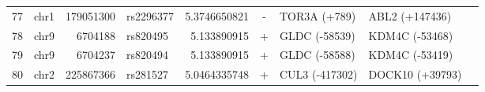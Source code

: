\begin{table}[h!]
\begin{tabular}{rlrlrcllc}
77 & chr1 & 179051300 & rs2296377 & 5.3746650821 & - & TOR3A (+789) & ABL2 (+147436)       & \\
78 & chr9 & 6704188 & rs820495 & 5.133890915 & + & GLDC (-58539) & KDM4C (-53468)       & \\
79 & chr9 & 6704237 & rs820494 & 5.133890915 & + & GLDC (-58588) & KDM4C (-53419)       & \\
80 & chr2 & 225867366 & rs281527 & 5.0464335748 & + & CUL3 (-417302) & DOCK10 (+39793)       & \\

\end{tabular}
\end{table}
